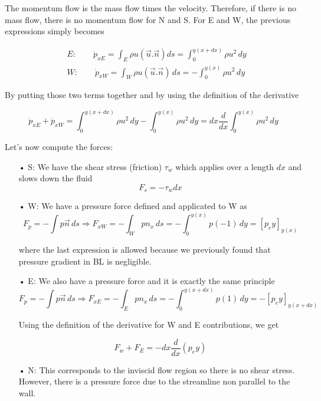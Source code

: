 The momentum flow is the mass flow times the velocity. Therefore, if there is no mass flow, there is no momentum flow for N and S. For E and W, the previous expressions simply becomes

\begin{equation}
\begin{aligned}
&E: \qquad
		\dot{p}_{xE}= \int_{E} \rho u (\vec{u}.\vec{n}) d s  
		= \int_{0}^{y(x+dx)} \rho u^2 \, dy  \\
&W: \qquad
		\dot{p}_{xW}= \int_{W} \rho u (\vec{u}.\vec{n})\, d s  
		= - \int_{0}^{y(x)} \rho u^2 \, dy  
		\end{aligned}
\end{equation}

By putting those two terms together and by using the definition of the derivative

\begin{equation}
\dot{p}_{xE}+\dot{p}_{xW} = \int_{0}^{y(x+dx)} \rho u^2 \, dy - \int_{0}^{y(x)} \rho u^2 \, dy  =dx \frac{d}{dx} \int_{0}^{y(x)} \rho u^2 \, dy
\end{equation}

Let's now compute the forces:\\

\begin{itemize}
\item[•] S: We have the shear stress (friction) $\tau_w$ which applies over a length $dx$ and slows down the fluid
\begin{equation}
	F_s = -\tau_w dx
\end{equation}  

\item[•] W: We have a pressure force defined and applicated to W as
\begin{equation}
F_p=- \int p \vec{n} \, d s \Rightarrow  F_{xW}=- \int_W p n_x\, d s=-\int_0^{y(x)} p (-1) \, dy=[p_e y]_{y(x)}
\end{equation}

where the last expression is allowed because we previously found that pressure gradient in BL is negligible. \\

\item[•] E: We also have a pressure force and it is exactly the same principle
\begin{equation}
F_p=- \int p \vec{n} \,d s \Rightarrow  F_{xE}=- \int_E p n_x \,d s=-\int_0^{y(x+dx)} p (1) \, dy=-[p_e y]_{y(x+dx)}
\end{equation}
	
Using the definition of the derivative for W and E contributions, we get

\begin{equation}
F_w+F_E=- dx \frac{d}{dx} (p_e y)
\end{equation}

\item[•] N: This corresponds to the inviscid flow region so there is no shear stress. However, there is a pressure force due to the streamline non parallel to the wall.\\
\end{itemize}

